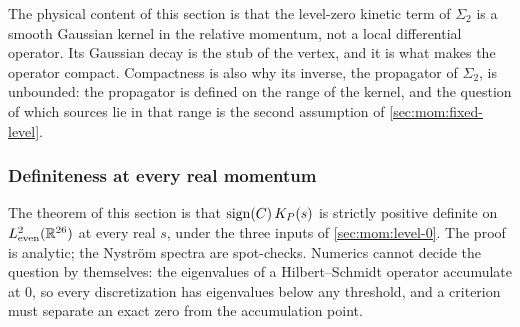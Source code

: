 The physical content of this section is that the level-zero kinetic term of $\Sigma_2$ is a smooth Gaussian kernel in the relative momentum, not a local differential operator.
Its Gaussian decay is the stub of the vertex, and it is what makes the operator compact.
Compactness is also why its inverse, the propagator of $\Sigma_2$, is unbounded: the propagator is defined on the range of the kernel, and the question of which sources lie in that range is the second assumption of \cref{sec:mom:fixed-level}.

\subsubsection{Definiteness at every real momentum}
\label{sec:mom:definite}


The theorem of this section is that $\operatorname{sign}(C) \, K_P(s)$ is strictly positive definite on $L^2_{\rm even}(\mathbb{R}^{26})$ at every real $s$, under the three inputs of \cref{sec:mom:level-0}.
The proof is analytic; the Nyström spectra are spot-checks.
Numerics cannot decide the question by themselves: the eigenvalues of a Hilbert--Schmidt operator accumulate at $0$, so every discretization has eigenvalues below any threshold, and a criterion must separate an exact zero from the accumulation point.

